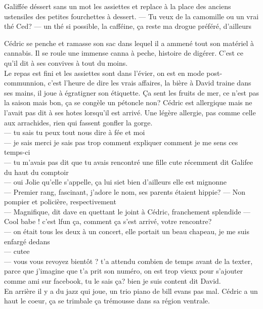 \documentclass{article}
\begin{document}
Galiffée déssert sans un mot les assiettes et replace à la place des anciens ustensiles
des petites fourchettes à dessert.
--- Tu veux de la camomille ou un vrai thé Ced?
--- un thé si possible, la cafféine, ça reste ma drogue préféré, d'ailleurs

Cédric se penche et ramasse son sac dans lequel il a ammené tout son matériel
à cannabis. Il se roule une immense canna à peche, histoire de digérer. C'est ce
qu'il dit à ses convives à tout du moins.\\

Le repas est fini et les assiettes sont dans l'évier, on est en mode post-communnion,
c'est l'heure de dire les vrais affaires, la bière à David traine dans ses mains, il
joue à égratigner son étiquette. Ça sent les fruits de mer, ce n'est pas la saison mais
bon, ça se congèle un pétoncle non? Cédric est allergique mais ne l'avait pas dit à ses
hotes lorsqu'il est arrivé. Une légère allergie, pas comme celle aux arrachides, rien
qui fassent gonfler la gorge. \\

--- tu sais tu peux tout nous dire à fée et moi \\
--- je sais merci je sais pas trop comment expliquer comment je me sens ces temps-ci\\
--- tu m'avais pas dit que tu avais rencontré une fille cute récemment dit Galifee du
haut du comptoir\\
--- oui Jolie qu'elle s'appelle, ça lui siet bien d'ailleurs elle est mignonne\\
--- Premier rang, fascinant, j'adore le nom, ses parents étaient hippie?
--- Non pompier et policière, respectivement\\
--- Magnifique, dit dave en quettant le joint à Cédric, franchement splendide
--- Cool babe ! c'est lfun ça, comment ça s'est arrivé, votre rencontre?\\
--- on était tous les deux à un concert, elle portait un beau chapeau, je me suis enfargé dedans\\
--- cutee\\
--- vous vous revoyez bientôt ? t'a attendu combien de temps avant de la texter,
parce que j'imagine que t'a prit son numéro, on est trop vieux pour s'ajouter comme ami
sur facebook, tu le sais ça? bien je suis content dit David.  \\

En arrière il y a du jazz qui joue, un trio piano de bill evans pas mal.
Cédric a un haut le coeur, ça se trimbale ça trémousse dans sa région ventrale.\\
\end{document}
